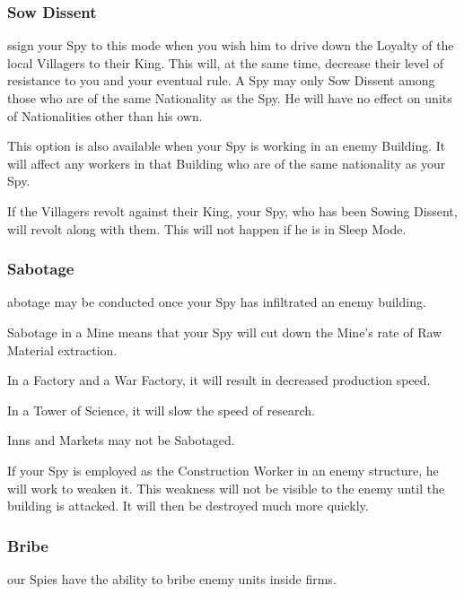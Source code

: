 \subsubsection{Sow Dissent}


ssign your Spy to this mode when you wish him to drive down the Loyalty of the local Villagers to their King. This will, at the same time, decrease their level of resistance to you and your eventual rule. A Spy may only Sow Dissent among those who are of the same Nationality as the Spy. He will have no effect on units of Nationalities other than his own.

This option is also available when your Spy is working in an enemy Building. It will affect any workers in that Building who are of the same nationality as your Spy.

If the Villagers revolt against their King, your Spy, who has been Sowing Dissent, will revolt along with them. This will not happen if he is in Sleep Mode.

\subsubsection{Sabotage}


abotage may be conducted once your Spy has infiltrated an enemy building.

Sabotage in a Mine means that your Spy will cut down the Mine’s rate of Raw Material extraction.

In a Factory and a War Factory, it will result in decreased production speed.

In a Tower of Science, it will slow the speed of research.

Inns and Markets may not be Sabotaged.

If your Spy is employed as the Construction Worker in an enemy structure, he will work to weaken it. This weakness will not be visible to the enemy until the building is attacked. It will then be destroyed much more quickly.

\subsubsection{Bribe}


our Spies have the ability to bribe enemy units inside firms.

